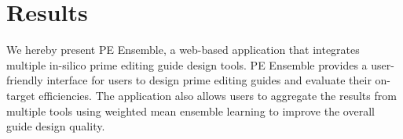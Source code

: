 \section{Results}

We hereby present PE Ensemble, a web-based application that integrates multiple in-silico prime editing guide design tools. PE Ensemble provides a user-friendly interface for users to design prime editing guides and evaluate their on-target efficiencies. The application also allows users to aggregate the results from multiple tools using weighted mean ensemble learning to improve the overall guide design quality.